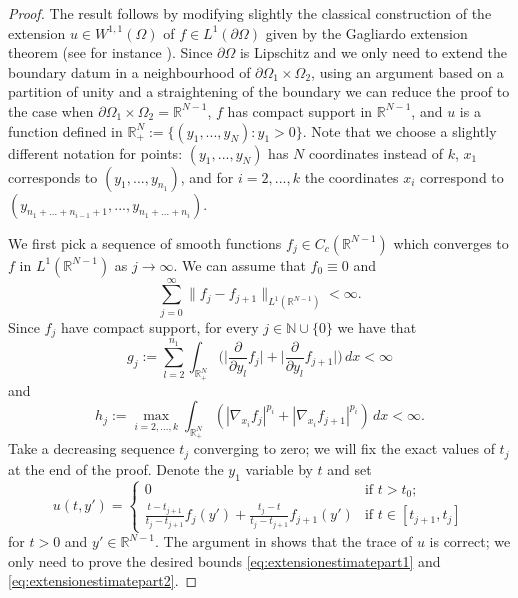 \documentclass[reqno,12pt]{amsart}
\def\R{\mathbb R}
\numberwithin{equation}{section}
\newcommand{\twopartdef}[4]
{
	\left\{
	\begin{array}{ll}
		#1 & #2 \\
		#3 & #4
	\end{array}
	\right.
}
\begin{document}
\begin{proof}
The result follows by modifying slightly the classical construction of the extension $u \in W^{1,1}(\Omega)$ of $f \in L^1(\partial\Omega)$ given by the Gagliardo extension theorem (see for instance \cite[Theorem 2.16]{Giu}). Since $\partial\Omega$ is Lipschitz and we only need to extend the boundary datum in a neighbourhood of $\partial\Omega_1 \times \Omega_2$, using an argument based on a partition of unity and a straightening of the boundary we can reduce the proof to the case when $\partial\Omega_1 \times \Omega_2 = \mathbb{R}^{N-1}$, $f$ has compact support in $\mathbb{R}^{N-1}$, and $u$ is a function defined in $\R^N_+ := \{ (y_1, ..., y_N): y_1 > 0 \}$. Note that we choose a slightly different notation for points: $(y_1, ..., y_N)$ has $N$ coordinates instead of $k$, $x_1$ corresponds to $(y_1, ..., y_{n_1})$, and for $i = 2,...,k$ the coordinates $x_i$ correspond to $(y_{n_1 + ... + n_{i-1} + 1}, ..., y_{n_1 + ... + n_i})$.

We first pick a sequence of smooth functions $f_j \in C_c(\R^{N-1})$ which converges to $f$ in $L^1(\R^{N-1})$ as $j \rightarrow \infty$. We can assume that $f_0 \equiv 0$ and
\begin{equation}\label{eq:finitesumfortheapproximation}
\sum_{j = 0}^\infty \| f_j - f_{j+1} \|_{L^1(\R^{N-1})} < \infty.
\end{equation}
Since $f_j$ have compact support, for every $j \in \mathbb{N} \cup \{ 0 \}$ we have that
\begin{equation}\label{eq:definitionofgj}
g_j := \sum_{l = 2}^{n_1} \int_{\R^N_+} \bigg( \bigg| \frac{\partial}{\partial y_l} f_j \bigg| + \bigg| \frac{\partial}{\partial y_l} f_{j+1} \bigg| \bigg) \, dx < \infty 
\end{equation}
and
\begin{equation}\label{eq:definitionofhj}
h_j := \max_{i = 2,...,k} \int_{\R^N_+} (|\nabla_{x_i} f_j|^{p_i} + |\nabla_{x_i} f_{j+1}|^{p_i}) \, dx < \infty. 
\end{equation}
Take a decreasing sequence $t_j$ converging to zero; we will fix the exact values of $t_j$ at the end of the proof. Denote the $y_1$ variable by $t$ and set
\begin{equation}
u(t,y') = \twopartdef{0}{\mbox{if } t > t_0;}{\frac{t - t_{j+1}}{t_j - t_{j+1}} f_j(y') + \frac{t_j - t}{t_j - t_{j+1}} f_{j+1}(y')}{\mbox{if } t \in [t_{j+1},t_{j}]}
\end{equation}
for $t > 0$ and $y' \in \mathbb{R}^{N-1}$. The argument in \cite{Giu} shows that the trace of $u$ is correct; we only need to prove the desired bounds \eqref{eq:extensionestimatepart1} and \eqref{eq:extensionestimatepart2}.


\end{proof}
\end{document}
